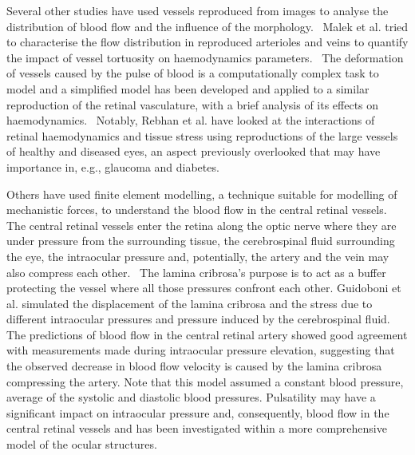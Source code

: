 \documentclass[12pt,a4paper]{journal}
\begin{document}
Several other studies have used vessels reproduced from images to analyse the distribution of blood flow and the influence of the morphology.~\cite{Malek_2014,Malek_2015,Rebhan_2019}
Malek et al. tried to characterise the flow distribution in reproduced arterioles and veins to quantify the impact of vessel tortuosity on haemodynamics parameters.~\cite{Malek_2014,Malek_2015}
The deformation of vessels caused by the pulse of blood is a computationally complex task to model and a simplified model has been developed and applied to a similar reproduction of the retinal vasculature, with a brief analysis of its effects on haemodynamics.~\cite{Aletti_2016}
Notably, Rebhan et al. have looked at the interactions of retinal haemodynamics and tissue stress using reproductions of the large vessels of healthy and diseased eyes, an aspect previously overlooked that may have importance in, e.g., glaucoma and diabetes.~\cite{Rebhan_2019}


Others have used finite element modelling, a technique suitable for modelling of mechanistic forces, to understand the blood flow in the central retinal vessels.~\cite{Guidoboni_2014,Jin_2020}
The central retinal vessels enter the retina along the optic nerve where they are under pressure from the surrounding tissue, the cerebrospinal fluid surrounding the eye, the intraocular pressure and, potentially, the artery and the vein may also compress each other.~\cite{Nickells_2012}
The lamina cribrosa's purpose is to act as a buffer protecting the vessel where all those pressures confront each other.
Guidoboni et al. simulated the displacement of the lamina cribrosa and the stress due to different intraocular pressures and pressure induced by the cerebrospinal fluid.~\cite{Guidoboni_2014}
The predictions of blood flow in the central retinal artery showed good agreement with measurements made during intraocular pressure elevation, suggesting that the observed decrease in blood flow velocity is caused by the lamina cribrosa compressing the artery.
Note that this model assumed a constant blood pressure, average of the systolic and diastolic blood pressures.
Pulsatility may have a significant impact on intraocular pressure and, consequently, blood flow in the central retinal vessels and has been investigated within a more comprehensive model of the ocular structures.~\cite{Jin_2020}
\end{document}
